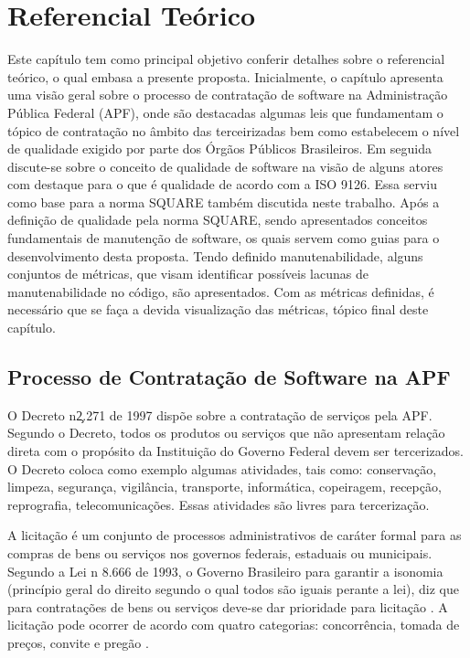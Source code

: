 
\chapter[Referencial Teórico]{Referencial Teórico}	
Este capítulo tem como principal objetivo conferir detalhes sobre o referencial teórico, o qual embasa a presente proposta.    Inicialmente, o capítulo apresenta uma visão geral sobre o processo de contratação de software na Administração Pública Federal (APF), onde são destacadas algumas leis que fundamentam o tópico de contratação no âmbito das terceirizadas bem como estabelecem o nível de qualidade exigido por parte dos Órgãos Públicos Brasileiros. Em seguida discute-se sobre o conceito de qualidade de software na visão de alguns atores com destaque para o que é qualidade de acordo com a ISO 9126. Essa serviu como base para a norma SQUARE também discutida neste trabalho. Após a definição de qualidade pela norma SQUARE, sendo apresentados conceitos fundamentais de manutenção de software, os quais servem como guias para o desenvolvimento desta proposta. Tendo definido manutenabilidade, alguns conjuntos de métricas, que visam identificar possíveis lacunas de manutenabilidade no código, são apresentados. Com as métricas definidas, é necessário que se faça a devida visualização das métricas, tópico final deste capítulo.
	
\section{Processo de Contratação de Software na APF}
O Decreto n\c 2.271 de 1997 \cite{decreto_2271} dispõe sobre a contratação de serviços pela APF. Segundo o Decreto, todos os produtos ou serviços que não apresentam relação direta com o propósito da Instituição do Governo Federal devem ser tercerizados. O Decreto coloca como exemplo algumas atividades, tais como: conservação, limpeza, segurança, vigilância, transporte, informática, copeiragem, recepção, reprografia, telecomunicações. Essas atividades são livres para tercerização.

A licitação é um conjunto de processos administrativos de caráter formal para as compras de bens ou serviços nos governos federais, estaduais ou municipais. Segundo a Lei  n 8.666 de 1993, o Governo Brasileiro para garantir a isonomia (princípio geral do direito segundo o qual todos são iguais perante a lei), diz que para contratações de bens ou serviços deve-se dar prioridade para licitação \cite{Lei_1993}. A licitação pode ocorrer de acordo com quatro categorias: concorrência, tomada de preços, convite e pregão \cite{brazil_licitacoes_2010}.


